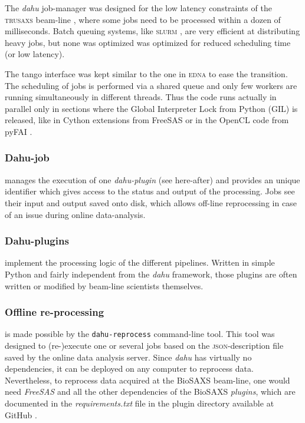 \documentclass[preprint]{iucr}              %
\begin{document}
The \textit{dahu} job-manager was designed for the low latency constraints of the \textsc{trusaxs} beam-line \cite{id02_2022}, where some jobs need to be processed within a dozen of milliseconds.
Batch queuing systems, like \textsc{slurm} \cite{slurm}, are very efficient at distributing heavy jobs, but none was optimized was optimized for reduced scheduling time (or low latency).

The tango interface \cite{tango} was kept similar to the one in \textsc{edna} to ease the transition.
The scheduling of jobs is performed via a shared queue and only few workers are running simultaneously in different threads.
Thus the code runs actually in parallel only in sections where the Global Interpreter Lock from Python (GIL) is released, like in Cython extensions \cite{cython} from FreeSAS or in the OpenCL code from pyFAI \cite{pyFAI_gpu}.



\subsubsection{Dahu-job}
manages the execution of one \textit{dahu-plugin} (see here-after) and provides an unique identifier which gives access to the status and output of the processing.
Jobs see their input and output saved onto disk, which allows off-line reprocessing in case of an issue during online data-analysis.

\subsubsection{Dahu-plugins} implement the processing logic of the different pipelines.
Written in simple Python and fairly independent from the \textit{dahu} framework, those plugins are often written or modified by beam-line scientists themselves.

\subsubsection{Offline re-processing}
is made possible by the \texttt{dahu-reprocess} command-line tool.
This tool was designed to (re-)execute one or several jobs based on the \textsc{json}-description file \cite{json} saved by the online data analysis server. 
Since \textit{dahu} has virtually no dependencies, it can be deployed on any computer to reprocess data. 
Nevertheless, to reprocess data acquired at the BioSAXS beam-line, one would need \textit{FreeSAS} and all the other dependencies of the BioSAXS \textit{plugins}, which are documented in the \textit{requirements.txt} file in the plugin directory available at GitHub \cite{dahu-bm29}.
\end{document}

